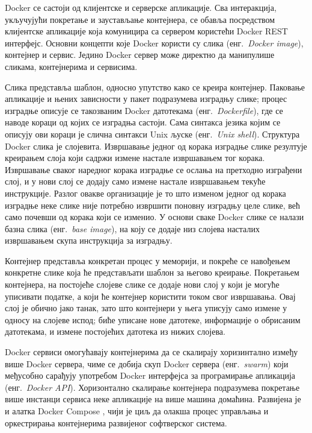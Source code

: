 \documentclass[12pt,oneside]{memoir}
\begin{document}
Docker се састоји од клијентске и серверске апликације. Сва интеракција, укључујући покретање и заустављање контејнера, се обавља посредством клијентске апликације која комуницира са сервером користећи Docker REST интерфејс. Основни концепти које Docker користи су слика (енг.~\textit{Docker image}), контејнер и сервис. Једино Docker сервер може директно да манипулише сликама, контејнерима и сервисима.

Слика представља шаблон, односно упутство како се креира контејнер. Паковање апликације и њених зависности у пакет подразумева изградњу слике; процес изградње описује се такозваним Docker датотекама (енг.~\textit{Dockerfile}), где се наводе кораци од којих се изградња састоји. Сама синтакса језика којим се описују ови кораци је слична синтакси Unix љуске (енг.~\textit{Unix shell}). Структура Docker слика је слојевита. Извршавање једног од корака изградње слике резултује креирањем слоја који садржи измене настале извршавањем тог корака. Извршавање сваког наредног корака изградње се ослања на претходно изграђени слој, и у нови слој се додају само измене настале извршавањем текуће инструкције. Разлог овакве организације је то што изменом једног од корака изградње неке слике није потребно извршити поновну изградњу целе слике, већ само почевши од корака који се изменио. У основи сваке Docker слике се налази базна слика (енг.~\textit{base image}), на коју се додаје низ слојева насталих извршавањем скупа инструкција за изградњу.

Контејнер представља конкретан процес у меморији, и покреће се навођењем конкретне слике која ће представљати шаблон за његово креирање. Покретањем контејнера, на постојеће слојеве слике се додаје нови слој у који је могуће уписивати податке, а који ће контејнер користити током свог извршавања. Овај слој је обично јако танак, зато што контејнери у њега уписују само измене у односу на слојеве испод; биће уписане нове датотеке, информације о обрисаним датотекама, и измене постојећих датотека из нижих слојева.

Docker сервиси омогућавају контејнерима да се скалирају хоризинтално између више Docker сервера, чиме се добија скуп Docker сервера (енг.~\textit{swarm}) који међусобно сарађују употребом Docker интерфејса за програмирање апликација (енг.~\textit{Docker API}). Хоризонтално скалирање контејнера подразумева покретање више инстанци сервиса неке апликације на више машина домаћина. Развијена је и алатка Docker Compose \cite{DockerCompose}, чији је циљ да олакша процес управљања и оркестрирања контејнерима развијеног софтверског система.
\end{document}
